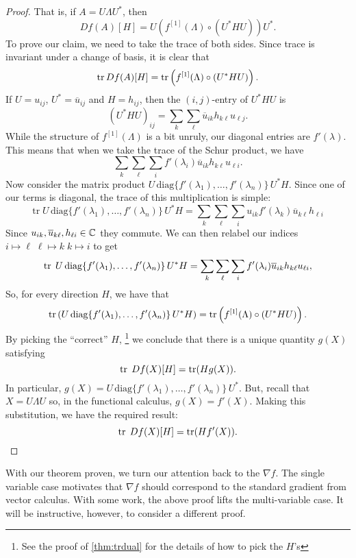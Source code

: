 \begin{proof}
That is, if $A = U   \Lambda U ^{*} $, then
\[
  Df(A)[H] = U \left( f ^{[1]} (\Lambda) \circ (U ^{* } H U) \right)U ^{*}.
\]
%
To prove our claim, we need to take the trace of both sides. Since trace is
invariant under a change of basis, it is clear that
\[
  \operatorname{tr} Df(A)[H] = \operatorname{tr} \left( f ^{[1]} (\Lambda) \circ (U ^{* } H U) \right).
\]
If $U = u_{ij}$, $U ^{*} = \overline{u}_{ij}$ and $H = h_{ij}$, then the
$(i,j)$-entry of $U ^{*}HU$ is
\[
  {(U ^{* } H U)}_{ij} = \sum_k\sum_\ell \overline{u}_{ik}h_{k\ell}u_{\ell j}.
\]
While the structure of
$f ^{[1]} (\Lambda)$ is a bit unruly, our diagonal entries are $f'(\lambda)$.
This means that when we take the trace of the Schur product, we have
\[
 \sum_k\sum_\ell \sum_i f'(\lambda_i)\overline{u}_{ik}h_{k\ell}u_{\ell i}.
\]
Now consider the matrix product
$U\, \text{diag} \{f'(\lambda_1), \dots ,f'(\lambda_n)\} \,U ^{*} H $. Since one of our terms
is diagonal, the trace of this multiplication is simple:
\[
  \text{tr}\; U \,\text{diag} \{f'(\lambda_1), \dots ,f'(\lambda_n)\}\, U ^{*} H
  = \sum_k\sum_\ell\sum_i  u_{ik}f'(\lambda_k) \overline{u}_{k \ell} h_{\ell i}
\]
Since \(u_{ik}, \overline{u}_{k\ell}, h_{\ell i} \in \mathbb{C} \) they commute. We can
then relabel our indices
$i \mapsto \ell\; \ell \mapsto k \; k \mapsto i $ to get
\[
  \operatorname{tr}\; U \,\text{diag} \{f'(\lambda_1), \dots ,f'(\lambda_n)\}\, U ^{*} H
  = \sum_k\sum_\ell \sum_i f'(\lambda_i) \overline{u}_{i k} h_{k \ell}u_{\ell i},
\]
So, for every direction \(H\), we have that
\[
  \operatorname{tr} \left( U\, \text{diag} \{f'(\lambda_1), \dots ,f'(\lambda_n)\} \,U ^{*} H\right) =
  \operatorname{tr} \left( f ^{[1]} (\Lambda) \circ (U ^{* } H U) \right).
\]
By picking the ``correct'' \(H\),
\footnote{See the proof of \ref{thm:trdual} for the details of how to pick the
  \(H\)'s}
we conclude that there is a unique quantity \(g(X)\) satisfying
\[
  \operatorname{tr} \;Df(X)[H] = \operatorname{tr}(Hg(X)).
\]
In particular,
\( g(X) = U\, \text{diag} \{f'(\lambda_1), \dots ,f'(\lambda_n)\} \,U ^{*} \). But,
recall that \(X=U\Lambda U\) so, in the functional calculus, $g(X) = f'(X)$.
Making this substitution, we have the required result:
\[
  \operatorname{tr} \; Df(X)[H] = \operatorname{tr} (H f'(X)).
\]
\end{proof}

With our theorem proven, we turn our attention back to the \(\nabla f\). The
single variable case motivates that \(\nabla f\) should correspond to the
standard gradient from vector calculus. With some work, the above proof lifts
the multi-variable case. It will be instructive, however, to consider a
different proof.

